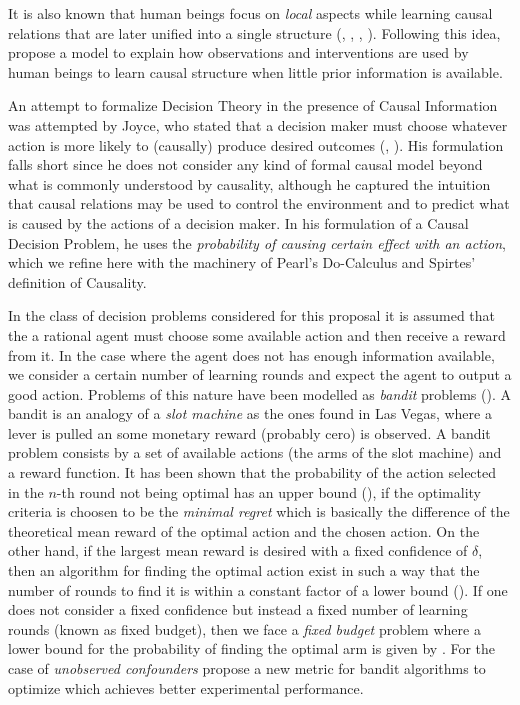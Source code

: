 \documentclass[english,letterpaper,12pt,final]{article}
\theoremstyle{definition}
\begin{document}
It is also known that human beings focus on \textit{local} aspects while learning causal relations that are later unified into a single structure (\cite{fernbach2009causal}, \cite{waldmann2008causal}, \cite{wellen2012learning}, \cite{danks2014unifying}). Following this idea, \cite{wellen2012learning} propose a model to explain how observations  and interventions are used by human beings to learn causal structure when little prior information is available. 

An attempt to formalize Decision Theory in the presence of Causal Information was attempted by Joyce, who stated that a decision maker must choose whatever action is more likely to (causally) produce desired outcomes (\cite{joyce1999foundations}, \cite{peterson2017introduction}). His formulation falls short since he does not consider any kind of formal causal model beyond what is commonly understood by causality, although he captured the intuition that causal relations may be used to control the environment and to predict what is caused by the actions of a decision maker. In his formulation of a Causal Decision Problem, he uses the \textit{probability of causing certain effect with an action}, which we refine here with the machinery of Pearl's Do-Calculus and Spirtes' definition of Causality. 

In the class of decision problems considered for this proposal it is assumed that the a rational agent must choose some available action and then receive a reward from it. In the case where the agent does not has enough information available, we consider a certain number of learning rounds and expect the agent to output a good action. Problems of this nature have been modelled as \textit{bandit} problems (\cite{sutton1998reinforcement}). A bandit is an analogy of a \textit{slot machine} as the ones found in Las Vegas, where a lever is pulled an some monetary reward (probably cero) is observed. A bandit problem consists by a set of available actions (the arms of the slot machine) and a reward function. It has been shown that the probability of the action selected in the $n$-th round not being optimal has an upper bound (\cite{audibert2010best}), if the optimality criteria is choosen to be the \textit{minimal regret} which is basically the difference of the theoretical mean reward of the optimal action and the chosen action. On the other hand, if the largest mean reward is desired with a fixed confidence of $\delta$, then an algorithm for finding the optimal action exist in such a way that the number of rounds to find it is within a constant factor of a lower bound (\cite{jamieson2014lil}).  If one does not consider a fixed confidence but instead a fixed number of learning rounds (known as fixed budget), then we face a \textit{fixed budget} problem where a lower bound for the probability of finding the optimal arm is given by \cite{carpentier2016tight}. For the case of \textit{unobserved confounders} \cite{bareinboim2015bandits} propose a new metric for bandit algorithms to optimize which achieves better experimental performance. 
\end{document}
